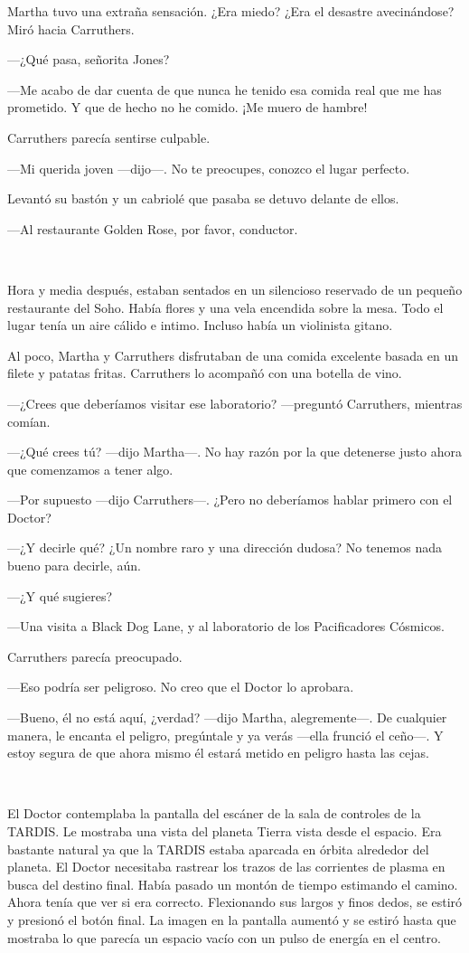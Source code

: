Martha tuvo una extraña sensación. ¿Era miedo? ¿Era el desastre
avecinándose? Miró hacia Carruthers.

---¿Qué pasa, señorita Jones?

---Me acabo de dar cuenta de que nunca he tenido esa comida real que me
has prometido. Y que de hecho no he comido. ¡Me muero de hambre!

Carruthers parecía sentirse culpable.

---Mi querida joven ---dijo---. No te preocupes, conozco el lugar
perfecto.

Levantó su bastón y un cabriolé que pasaba se detuvo delante de ellos.

---Al restaurante Golden Rose, por favor, conductor.

~

Hora y media después, estaban sentados en un silencioso reservado de un
pequeño restaurante del Soho. Había flores y una vela encendida sobre la
mesa. Todo el lugar tenía un aire cálido e intimo. Incluso había un
violinista gitano.

Al poco, Martha y Carruthers disfrutaban de una comida excelente basada
en un filete y patatas fritas. Carruthers lo acompañó con una botella de
vino.

---¿Crees que deberíamos visitar ese laboratorio? ---preguntó
Carruthers, mientras comían.

---¿Qué crees tú? ---dijo Martha---. No hay razón por la que detenerse
justo ahora que comenzamos a tener algo.

---Por supuesto ---dijo Carruthers---. ¿Pero no deberíamos hablar
primero con el Doctor?

---¿Y decirle qué? ¿Un nombre raro y una dirección dudosa? No tenemos
nada bueno para decirle, aún.

---¿Y qué sugieres?

---Una visita a Black Dog Lane, y al laboratorio de los Pacificadores
Cósmicos.

Carruthers parecía preocupado.

---Eso podría ser peligroso. No creo que el Doctor lo aprobara.

---Bueno, él no está aquí, ¿verdad? ---dijo Martha, alegremente---. De
cualquier manera, le encanta el peligro, pregúntale y ya verás ---ella
frunció el ceño---. Y estoy segura de que ahora mismo él estará metido
en peligro hasta las cejas.

~

El Doctor contemplaba la pantalla del escáner de la sala de controles de
la TARDIS. Le mostraba una vista del planeta Tierra vista desde el
espacio. Era bastante natural ya que la TARDIS estaba aparcada en órbita
alrededor del planeta. El Doctor necesitaba rastrear los trazos de las
corrientes de plasma en busca del destino final. Había pasado un montón
de tiempo estimando el camino. Ahora tenía que ver si era correcto.
Flexionando sus largos y finos dedos, se estiró y presionó el botón
final. La imagen en la pantalla aumentó y se estiró hasta que mostraba
lo que parecía un espacio vacío con un pulso de energía en el centro.

